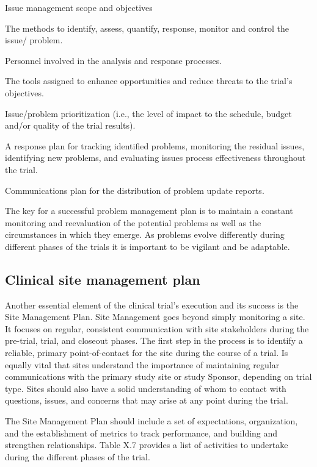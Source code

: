\documentclass[]{book}
\begin{document}
Issue management scope and objectives

The methods to identify, assess, quantify, response, monitor and control
the issue/ problem.

Personnel involved in the analysis and response processes.

The tools assigned to enhance opportunities and reduce threats to the
trial's objectives.

Issue/problem prioritization (i.e., the level of impact to the schedule,
budget and/or quality of the trial results).

A response plan for tracking identified problems, monitoring the
residual issues, identifying new problems, and evaluating issues process
effectiveness throughout the trial.

Communications plan for the distribution of problem update reports.

The key for a successful problem management plan is to maintain a
constant monitoring and reevaluation of the potential problems as well
as the circumstances in which they emerge. As problems evolve
differently during different phases of the trials it is important to be
vigilant and be adaptable.

\subsection{Clinical site management
plan}\label{clinical-site-management-plan}

Another essential element of the clinical trial's execution and its
success is the Site Management Plan. Site Management goes beyond simply
monitoring a site. It focuses on regular, consistent communication with
site stakeholders during the pre-trial, trial, and closeout phases. The
first step in the process is to identify a reliable, primary
point-of-contact for the site during the course of a trial. Is equally
vital that sites understand the importance of maintaining regular
communications with the primary study site or study Sponsor, depending
on trial type. Sites should also have a solid understanding of whom to
contact with questions, issues, and concerns that may arise at any point
during the trial.

The Site Management Plan should include a set of expectations,
organization, and the establishment of metrics to track performance, and
building and strengthen relationships. Table X.7 provides a list of
activities to undertake during the different phases of the trial.
\end{document}
